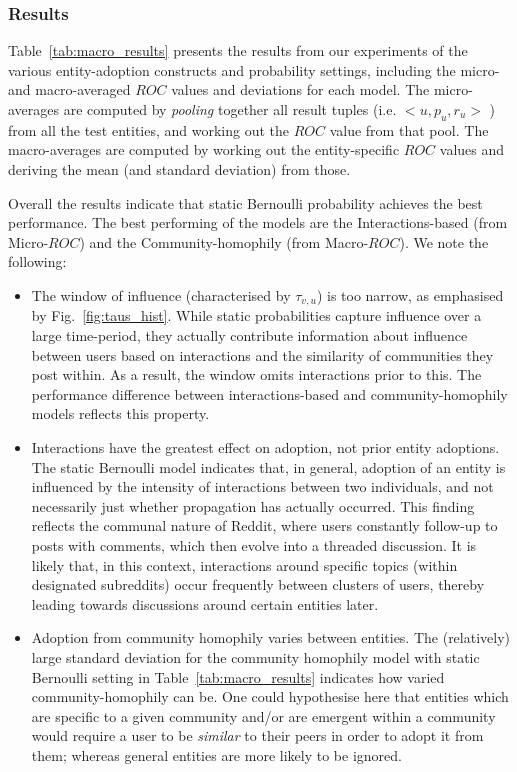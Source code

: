 \documentclass[sigconf]{acmart}
\begin{document}
\subsubsection{Results}
Table~\ref{tab:macro_results} presents the results from our experiments of the various entity-adoption constructs and probability settings, including the micro- and macro-averaged $ROC$ values and deviations for each model.
The micro-averages are computed by \emph{pooling} together all result tuples (i.e. $<u, p_u, r_u>$ ) from all the test entities, and working out the $ROC$ value from that pool. The macro-averages are computed by working out the entity-specific $ROC$ values and deriving the mean (and standard deviation) from those.

Overall the results indicate that static Bernoulli probability achieves the best performance. The best performing of the models are the Interactions-based (from Micro-$ROC$) and the Community-homophily (from Macro-$ROC$).
We note the following:

\begin{itemize}
	\item The window of influence (characterised by $\tau_{v,u}$) is too narrow, as emphasised by Fig.~\ref{fig:taus_hist}. 
	While static probabilities capture influence over a large time-period, they actually contribute information about influence between users based on interactions and the similarity of communities they post within. 
	As a result, the window omits interactions prior to this.
	The performance difference between interactions-based and community-homophily models reflects this property.
		
	\item Interactions have the greatest effect on adoption, not prior entity adoptions.
	The static Bernoulli model indicates that, in general, adoption of an entity is influenced by the intensity of interactions between two individuals, and not necessarily just whether propagation has actually occurred.
	This finding reflects the communal nature of Reddit, where users constantly follow-up to posts with comments, which then evolve into a threaded discussion.
	It is likely that, in this context, interactions around specific topics (within designated subreddits) occur frequently between clusters of users, thereby leading towards discussions around certain entities later.
	
	\item Adoption from community homophily varies between entities.
	The (relatively) large standard deviation for the community homophily model with static Bernoulli setting in Table~\ref{tab:macro_results} indicates how varied community-homophily can be.
	One could hypothesise here that entities which are specific to a given community and/or are emergent within a community would require a user to be \emph{similar} to their peers in order to adopt it from them; whereas general entities are more likely to be ignored.
	
\end{itemize}
\end{document}
